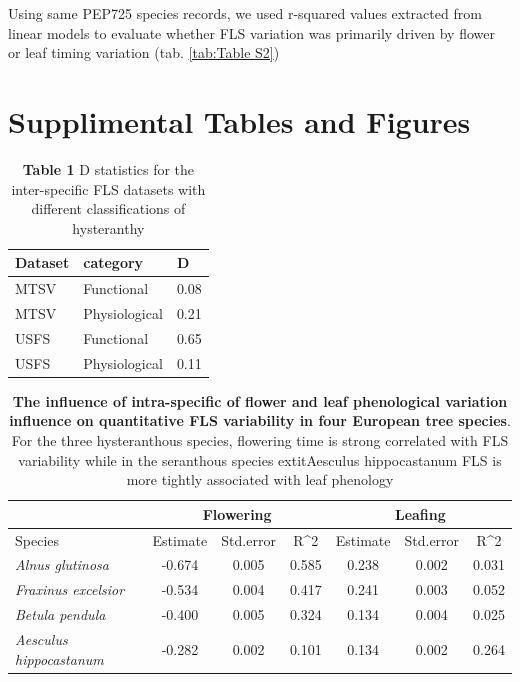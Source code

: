 \documentclass[12pt]{article}\usepackage[]{graphicx}\usepackage[]{color}
\begin{document}
\indent Using same PEP725 species records, we used r-squared values extracted from linear models \citep{baseR} to evaluate whether FLS variation was primarily driven by flower or leaf timing variation (tab. \ref{tab:Table S2})\\


\section*{Supplimental Tables and Figures}
\begin{table}[ht]
\centering
\begin{tabular}{l|l|l}
  \hline
Dataset & category & D \\ 
  \hline
MTSV & Functional & 0.08 \\ 
  MTSV & Physiological & 0.21 \\ 
  USFS & Functional & 0.65 \\ 
  USFS & Physiological & 0.11 \\ 
   \hline
\end{tabular}
\caption{\textbf{Table 1} D statistics for the inter-specific FLS datasets with different classifications of hysteranthy} 
\label{Test_table}
\end{table}


\begin{table}[ht]
\centering
\begin{tabular}{lcc|c||cc|c}
  & \multicolumn{3}{c}{Flowering} & \multicolumn{3}{c}{Leafing}\\
 \hline
Species & Estimate & Std.error & R^2 & Estimate & Std.error & R^2 \\ 
  \hline
\textit{Alnus glutinosa} & -0.674 & 0.005 & 0.585 & 0.238 & 0.002 & 0.031 \\ 
  \textit{Fraxinus excelsior} & -0.534 & 0.004 & 0.417 & 0.241 & 0.003 & 0.052 \\ 
  \textit{Betula pendula} & -0.400 & 0.005 & 0.324 & 0.134 & 0.004 & 0.025 \\ 
  \textit{Aesculus hippocastanum} & -0.282 & 0.002 & 0.101 & 0.134 & 0.002 & 0.264 \\ 
   \hline
\end{tabular}
\caption{\textbf{The influence of intra-specific of flower and leaf phenological variation influence on quantitative FLS variability in four European tree species}. For the three hysteranthous species, flowering time is strong correlated with FLS variability while in the seranthous species 	extit{Aesculus hippocastanum} FLS is more tightly associated with leaf phenology} 
\label{Table2}
\end{table}
\end{document}
